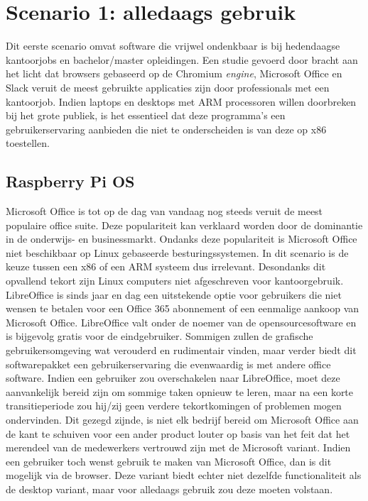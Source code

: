 \newpage
\section{Scenario 1: alledaags gebruik}
Dit eerste scenario omvat software die vrijwel ondenkbaar is bij hedendaagse kantoorjobs en bachelor/master opleidingen. Een studie gevoerd door \textcite{Braganza2022} bracht aan het licht dat browsers gebaseerd op de Chromium \textit{engine}, Microsoft Office en Slack veruit de meest gebruikte applicaties zijn door professionals met een kantoorjob. Indien laptops en desktops met ARM processoren willen doorbreken bij het grote publiek, is het essentieel dat deze programma’s een gebruikerservaring aanbieden die niet te onderscheiden is van deze op x86 toestellen.

\subsection{Raspberry Pi OS}
Microsoft Office is tot op de dag van vandaag nog steeds veruit de meest populaire office suite. Deze populariteit kan verklaard worden door de dominantie in de onderwijs- en businessmarkt. Ondanks deze populariteit is Microsoft Office niet beschikbaar op Linux gebaseerde besturingssystemen. In dit scenario is de keuze tussen een x86 of een ARM systeem dus irrelevant. Desondanks dit opvallend tekort zijn Linux computers niet afgeschreven voor kantoorgebruik. LibreOffice is sinds jaar en dag een uitstekende optie voor gebruikers die niet wensen te betalen voor een Office 365 abonnement of een eenmalige aankoop van Microsoft Office. LibreOffice valt onder de noemer van de opensourcesoftware en is bijgevolg gratis voor de eindgebruiker. Sommigen zullen de grafische gebruikersomgeving wat verouderd en rudimentair vinden, maar verder biedt dit softwarepakket een gebruikerservaring die evenwaardig is met andere office software. Indien een gebruiker zou overschakelen naar LibreOffice, moet deze aanvankelijk bereid zijn om sommige taken opnieuw te leren, maar na een korte transitieperiode zou hij/zij geen verdere tekortkomingen of problemen mogen ondervinden. Dit gezegd zijnde, is niet elk bedrijf bereid om Microsoft Office aan de kant te schuiven voor een ander product louter op basis van het feit dat het merendeel van de medewerkers vertrouwd zijn met de Microsoft variant. Indien een gebruiker toch wenst gebruik te maken van Microsoft Office, dan is dit mogelijk via de browser. Deze variant biedt echter niet dezelfde functionaliteit als de desktop variant, maar voor alledaags gebruik zou deze moeten volstaan.

